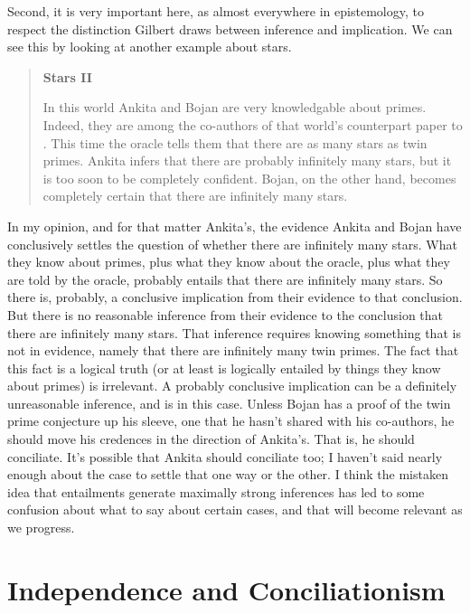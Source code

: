 Second, it is very important here, as almost everywhere in epistemology, to respect the distinction Gilbert \citet{Harman1986} draws between inference and implication. We can see this by looking at another example about stars.

\begin{quote}
\textbf{Stars II}

In this world \gls{Ankita} and \gls{Bojan} are very knowledgable about primes. Indeed, they are among the co-authors of that world's counterpart paper to \citet{Polymath2014}. This time the oracle tells them that there are as many stars as twin primes. \gls{Ankita} infers that there are probably infinitely many stars, but it is too soon to be completely confident. \gls{Bojan}, on the other hand, becomes completely certain that there are infinitely many stars.
\end{quote}
In my opinion, and for that matter \gls{Ankita}'s, the evidence \gls{Ankita} and \gls{Bojan} have conclusively settles the question of whether there are infinitely many stars. What they know about primes, plus what they know about the oracle, plus what they are told by the oracle, probably entails that there are infinitely many stars. So there is, probably, a conclusive implication from their evidence to that conclusion. But there is no reasonable inference from their evidence to the conclusion that there are infinitely many stars. That inference requires knowing something that is not in evidence, namely that there are infinitely many twin primes. The fact that this fact is a logical truth (or at least is logically entailed by things they know about primes) is irrelevant. A probably conclusive implication can be a definitely unreasonable inference, and is in this case. Unless \gls{Bojan} has a proof of the twin prime conjecture up his sleeve, one that he hasn't shared with his co-authors, he should move his credences in the direction of \gls{Ankita}'s. That is, he should conciliate. It's possible that \gls{Ankita} should conciliate too; I haven't said nearly enough about the case to settle that one way or the other. I think the mistaken idea that entailments generate maximally strong inferences has led to some confusion about what to say about certain cases, and that will become relevant as we progress.

\section{Independence and Conciliationism}
\label{independenceandconciliationism}

